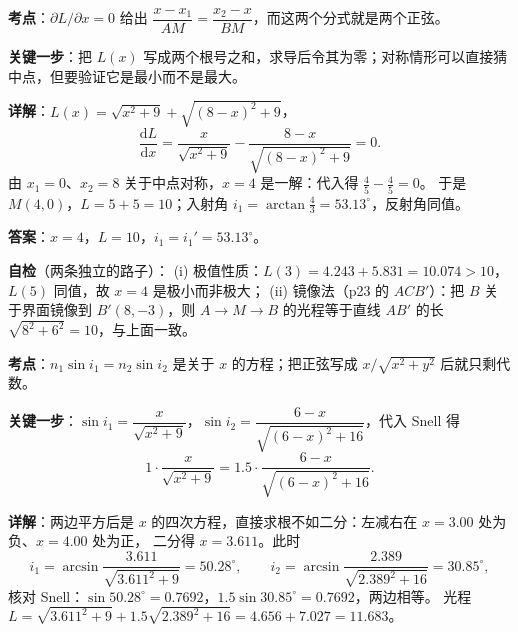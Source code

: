\documentclass[11pt]{ctexart}
\renewcommand{\qbreak}{\needspace{0.36\textheight}}
\begin{document}
\qbreak
{}

\textbf{考点}：$\partial L/\partial x=0$ 给出 $\dfrac{x-x_1}{AM}=\dfrac{x_2-x}{BM}$，而这两个分式就是两个正弦。

\textbf{关键一步}：把 $L(x)$ 写成两个根号之和，求导后令其为零；对称情形可以直接猜中点，但要验证它是最小而不是最大。

\textbf{详解}：$L(x)=\sqrt{x^2+9}+\sqrt{(8-x)^2+9}$，
\[
\frac{\mathrm{d}L}{\mathrm{d}x}=\frac{x}{\sqrt{x^2+9}}-\frac{8-x}{\sqrt{(8-x)^2+9}}=0 .
\]
由 $x_1=0$、$x_2=8$ 关于中点对称，$x=4$ 是一解：代入得 $\frac{4}{5}-\frac{4}{5}=0$。
于是 $M(4,0)$，$L=5+5=10$；入射角 $i_1=\arctan\frac{4}{3}=53.13^\circ$，反射角同值。

\textbf{答案}：$x=4$，$L=10$，$i_1=i_1'=53.13^\circ$。

\textbf{自检}（两条独立的路子）：
(i) 极值性质：$L(3)=4.243+5.831=10.074>10$，$L(5)$ 同值，故 $x=4$ 是极小而非极大；
(ii) 镜像法（p23 的 $ACB'$）：把 $B$ 关于界面镜像到 $B'(8,-3)$，则
$A\to M\to B$ 的光程等于直线 $AB'$ 的长 $\sqrt{8^2+6^2}=10$，与上面一致。

\qbreak
{}

\textbf{考点}：$n_1\sin i_1=n_2\sin i_2$ 是关于 $x$ 的方程；把正弦写成 $x/\sqrt{x^2+y^2}$ 后就只剩代数。

\textbf{关键一步}：$\sin i_1=\dfrac{x}{\sqrt{x^2+9}}$，$\sin i_2=\dfrac{6-x}{\sqrt{(6-x)^2+16}}$，代入 Snell 得
\[
1\cdot\frac{x}{\sqrt{x^2+9}}=1.5\cdot\frac{6-x}{\sqrt{(6-x)^2+16}} .
\]

\textbf{详解}：两边平方后是 $x$ 的四次方程，直接求根不如二分：左减右在 $x=3.00$ 处为负、$x=4.00$ 处为正，
二分得 $x=3.611$。此时
\[
i_1=\arcsin\frac{3.611}{\sqrt{3.611^2+9}}=50.28^\circ,\qquad
i_2=\arcsin\frac{2.389}{\sqrt{2.389^2+16}}=30.85^\circ ,
\]
核对 Snell：$\sin50.28^\circ=0.7692$，$1.5\sin30.85^\circ=0.7692$，两边相等。
光程 $L=\sqrt{3.611^2+9}+1.5\sqrt{2.389^2+16}=4.656+7.027=11.683$。
\end{document}
